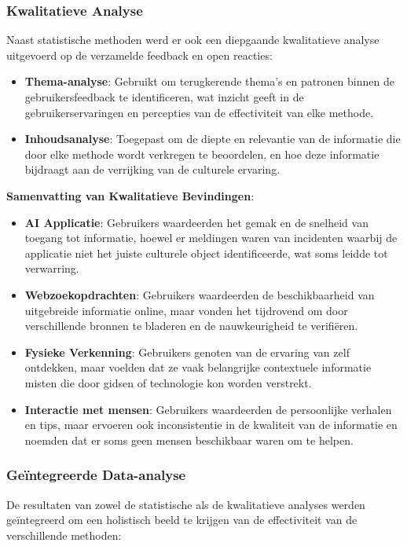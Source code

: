 \subsubsection{Kwalitatieve Analyse}
Naast statistische methoden werd er ook een diepgaande kwalitatieve analyse uitgevoerd op de verzamelde feedback en open reacties:

\begin{itemize}
    \item \textbf{Thema-analyse}: Gebruikt om terugkerende thema’s en patronen binnen de gebruikersfeedback te identificeren, wat inzicht geeft in de gebruikerservaringen en percepties van de effectiviteit van elke methode.
    \item \textbf{Inhoudsanalyse}: Toegepast om de diepte en relevantie van de informatie die door elke methode wordt verkregen te beoordelen, en hoe deze informatie bijdraagt aan de verrijking van de culturele ervaring.
\end{itemize}

\textbf{Samenvatting van Kwalitatieve Bevindingen}:

\begin{itemize}
    \item \textbf{AI Applicatie}: Gebruikers waardeerden het gemak en de snelheid van toegang tot informatie, hoewel er meldingen waren van incidenten waarbij de applicatie niet het juiste culturele object identificeerde, wat soms leidde tot verwarring.
    \item \textbf{Webzoekopdrachten}: Gebruikers waardeerden de beschikbaarheid van uitgebreide informatie online, maar vonden het tijdrovend om door verschillende bronnen te bladeren en de nauwkeurigheid te verifiëren.
    \item \textbf{Fysieke Verkenning}: Gebruikers genoten van de ervaring van zelf ontdekken, maar voelden dat ze vaak belangrijke contextuele informatie misten die door gidsen of technologie kon worden verstrekt.
    \item \textbf{Interactie met mensen}: Gebruikers waardeerden de persoonlijke verhalen en tips, maar ervoeren ook inconsistentie in de kwaliteit van de informatie en noemden dat er soms geen mensen beschikbaar waren om te helpen.
\end{itemize}

\subsubsection{Geïntegreerde Data-analyse}
De resultaten van zowel de statistische als de kwalitatieve analyses werden geïntegreerd om een holistisch beeld te krijgen van de effectiviteit van de verschillende methoden:


